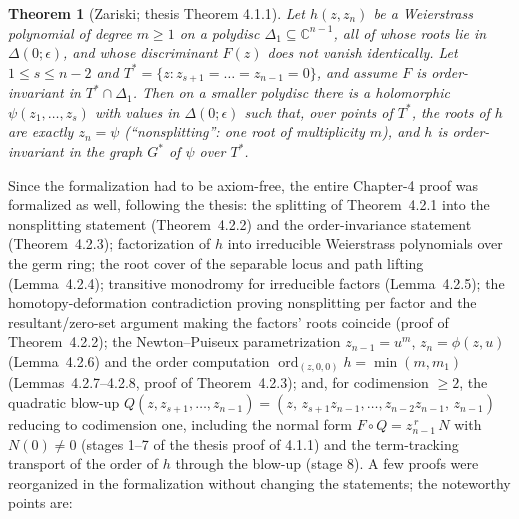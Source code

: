 \documentclass[11pt,a4paper]{article}
\theoremstyle{plain}
\newtheorem{theorem}{Theorem}[section]
\theoremstyle{definition}
\newcommand{\C}{\mathbb{C}}
\DeclareMathOperator{\ord}{ord}
\begin{document}
\begin{theorem}[Zariski; thesis Theorem 4.1.1]\label{thm:zariski}
Let $h(z,z_n)$ be a Weierstrass polynomial of degree $m\ge 1$ on a polydisc
$\Delta_1\subseteq\C^{n-1}$, all of whose roots lie in $\Delta(0;\epsilon)$,
and whose discriminant $F(z)$ does not vanish identically. Let
$1\le s\le n-2$ and $T^*=\{z:z_{s+1}=\dots=z_{n-1}=0\}$, and assume $F$ is
order-invariant in $T^*\cap\Delta_1$. Then on a smaller polydisc there is a
holomorphic $\psi(z_1,\dots,z_s)$ with values in $\Delta(0;\epsilon)$ such
that, over points of $T^*$, the roots of $h$ are exactly $z_n=\psi$
(``nonsplitting'': one root of multiplicity $m$), and $h$ is order-invariant
in the graph $G^*$ of $\psi$ over $T^*$.
\end{theorem}

Since the formalization had to be axiom-free, the entire Chapter-4 proof was
formalized as well, following the thesis: the splitting of Theorem~4.2.1 into
the nonsplitting statement (Theorem~4.2.2) and the order-invariance statement
(Theorem~4.2.3); factorization of $h$ into irreducible Weierstrass polynomials
over the germ ring; the root cover of the separable locus and path lifting
(Lemma~4.2.4); transitive monodromy for irreducible factors (Lemma~4.2.5);
the homotopy-deformation contradiction proving nonsplitting per factor and the
resultant/zero-set argument making the factors' roots coincide
(proof of Theorem~4.2.2); the Newton--Puiseux parametrization
$z_{n-1}=u^m$, $z_n=\phi(z,u)$ (Lemma~4.2.6) and the order computation
$\ord_{(z,0,0)}h=\min(m,m_1)$ (Lemmas~4.2.7--4.2.8, proof of Theorem~4.2.3);
and, for codimension $\ge 2$, the quadratic blow-up
$Q(z,z_{s+1},\dots,z_{n-1})=(z,\,z_{s+1}z_{n-1},\dots,z_{n-2}z_{n-1},\,
z_{n-1})$ reducing to codimension one, including the normal form
$F\circ Q=z_{n-1}^{\,r}\,N$ with $N(0)\neq0$ (stages 1--7 of the thesis proof
of 4.1.1) and the term-tracking transport of the order of $h$ through the
blow-up (stage 8). A few proofs were reorganized in the formalization without
changing the statements; the noteworthy points are:
\end{document}
